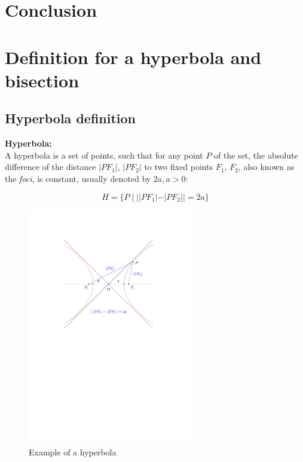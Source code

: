 



\chapter{Conclusion}



\newpage

\appendix

\chapter{Definition for a hyperbola and bisection}
\label{appendix:def}
\section{Hyperbola definition} 

\begin{mydef}
	\textbf{Hyperbola:} \\ 
	A hyperbola is a set of
	points, such that for any point $P$ of the set, the absolute difference of
	the distance $|PF_1|$, $|PF_2|$ to two fixed points $F_1$, $F_2$, also known
	as the \textit{foci}, is constant, usually denoted by $2a, a>0$\cite{Hyperbola}:
	
	$$H=\{P \mid ||PF_1|-|PF_2|| = 2a\}$$ 
\end{mydef}

\begin{figure}[H] 
	\centering
	\includegraphics[width=0.65\textwidth]{figures/hyperbola.pdf} 
	\caption{Example of a hyperbola} 
	\label{fig:hyperbola} 
\end{figure}

